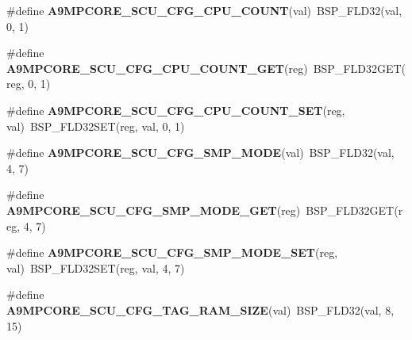 \begin{DoxyCompactItemize}
\item 
\mbox{\label{arm-a9mpcore-regs_8h_adfe963a51143ecc2471ff6d27133feb3}} 
\#define {\bfseries A9\+M\+P\+C\+O\+R\+E\+\_\+\+S\+C\+U\+\_\+\+C\+F\+G\+\_\+\+C\+P\+U\+\_\+\+C\+O\+U\+NT}(val)~B\+S\+P\+\_\+\+F\+L\+D32(val, 0, 1)
\item 
\mbox{\label{arm-a9mpcore-regs_8h_a14cd111131da2a8f0728e3a5b06adac9}} 
\#define {\bfseries A9\+M\+P\+C\+O\+R\+E\+\_\+\+S\+C\+U\+\_\+\+C\+F\+G\+\_\+\+C\+P\+U\+\_\+\+C\+O\+U\+N\+T\+\_\+\+G\+ET}(reg)~B\+S\+P\+\_\+\+F\+L\+D32\+G\+ET(reg, 0, 1)
\item 
\mbox{\label{arm-a9mpcore-regs_8h_adce07b10f9c4d77feeb90c3e392a3178}} 
\#define {\bfseries A9\+M\+P\+C\+O\+R\+E\+\_\+\+S\+C\+U\+\_\+\+C\+F\+G\+\_\+\+C\+P\+U\+\_\+\+C\+O\+U\+N\+T\+\_\+\+S\+ET}(reg,  val)~B\+S\+P\+\_\+\+F\+L\+D32\+S\+ET(reg, val, 0, 1)
\item 
\mbox{\label{arm-a9mpcore-regs_8h_afab54961096f9db957b82d8093f6acae}} 
\#define {\bfseries A9\+M\+P\+C\+O\+R\+E\+\_\+\+S\+C\+U\+\_\+\+C\+F\+G\+\_\+\+S\+M\+P\+\_\+\+M\+O\+DE}(val)~B\+S\+P\+\_\+\+F\+L\+D32(val, 4, 7)
\item 
\mbox{\label{arm-a9mpcore-regs_8h_afeef27c9c2beec758689ba29fec97103}} 
\#define {\bfseries A9\+M\+P\+C\+O\+R\+E\+\_\+\+S\+C\+U\+\_\+\+C\+F\+G\+\_\+\+S\+M\+P\+\_\+\+M\+O\+D\+E\+\_\+\+G\+ET}(reg)~B\+S\+P\+\_\+\+F\+L\+D32\+G\+ET(reg, 4, 7)
\item 
\mbox{\label{arm-a9mpcore-regs_8h_a7fe8775557751eb3c9d316ff3892a73c}} 
\#define {\bfseries A9\+M\+P\+C\+O\+R\+E\+\_\+\+S\+C\+U\+\_\+\+C\+F\+G\+\_\+\+S\+M\+P\+\_\+\+M\+O\+D\+E\+\_\+\+S\+ET}(reg,  val)~B\+S\+P\+\_\+\+F\+L\+D32\+S\+ET(reg, val, 4, 7)
\item 
\mbox{\label{arm-a9mpcore-regs_8h_a5cc11499b5c4ca0f58813ee5bb45eae2}} 
\#define {\bfseries A9\+M\+P\+C\+O\+R\+E\+\_\+\+S\+C\+U\+\_\+\+C\+F\+G\+\_\+\+T\+A\+G\+\_\+\+R\+A\+M\+\_\+\+S\+I\+ZE}(val)~B\+S\+P\+\_\+\+F\+L\+D32(val, 8, 15)
\item 
\mbox{\label{arm-a9mpcore-regs_8h_af50b3f8a851ad880fdc87d540611ff46}} 

\end{DoxyCompactItemize}
